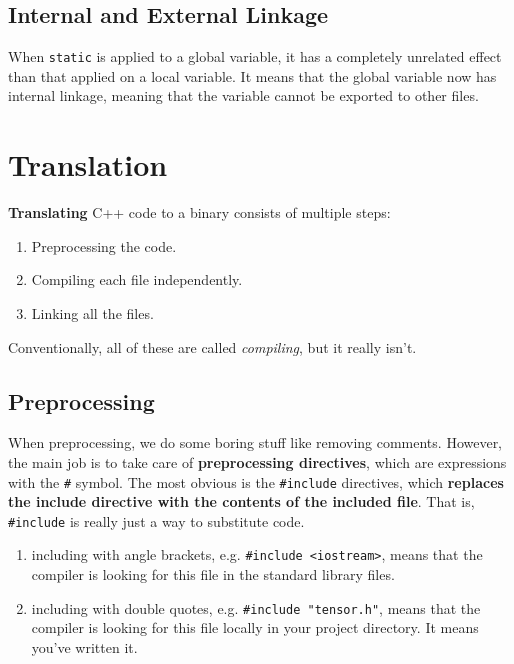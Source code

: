 \documentclass{article}
\begin{document}
  \subsection{Internal and External Linkage} 

    When \texttt{static} is applied to a global variable, it has a completely unrelated effect than that applied on a local variable. It means that the global variable now has internal linkage, meaning that the variable cannot be exported to other files. 

\section{Translation} 

    \textbf{Translating} C++ code to a binary consists of multiple steps: 
    \begin{enumerate}
      \item Preprocessing the code. 
      \item Compiling each file independently. 
      \item Linking all the files. 
    \end{enumerate}
    Conventionally, all of these are called \textit{compiling}, but it really isn't. 

  \subsection{Preprocessing} 

    When preprocessing, we do some boring stuff like removing comments. However, the main job is to take care of \textbf{preprocessing directives}, which are expressions with the \texttt{\#} symbol. The most obvious is the \texttt{\#include} directives, which \textbf{replaces the include directive with the contents of the included file}. That is, \texttt{\#include} is really just a way to substitute code.  
    \begin{enumerate}
      \item including with angle brackets, e.g. \texttt{\#include <iostream>}, means that the compiler is looking for this file in the standard library files. 
      \item including with double quotes, e.g. \texttt{\#include "tensor.h"}, means that the compiler is looking for this file locally in your project directory. It means you've written it. 
    \end{enumerate}
    
\end{document}
